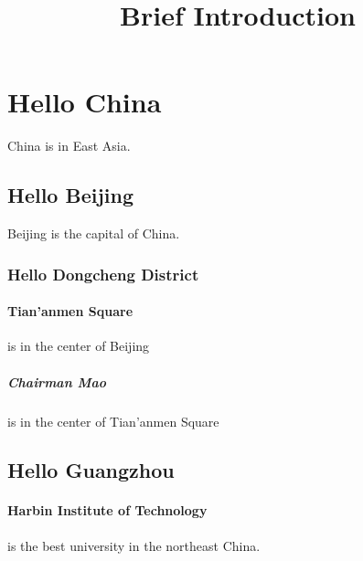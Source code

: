 \documentclass{article}
\title{Brief Introduction}
\begin{document}
	\maketitle
	\section{Hello China} China is in East Asia.
	\subsection{Hello Beijing} Beijing is the capital of China.
	\subsubsection{Hello Dongcheng District}
	\paragraph{Tian'anmen Square}is in the center of Beijing
	\subparagraph{Chairman Mao} is in the center of Tian'anmen Square
	\subsection{Hello Guangzhou}
	\paragraph{Harbin Institute of Technology} is the best university in the northeast China.
\end{document}
